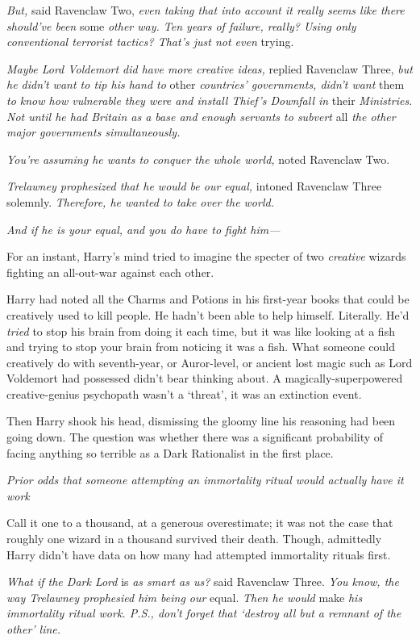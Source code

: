 \emph{But,} said Ravenclaw Two, \emph{even taking that into account{\el} it
really seems like there should've been} some \emph{other way. Ten years of
failure, really? Using only conventional terrorist tactics? That's just{\el}
not even} trying.

\emph{Maybe Lord Voldemort did have more creative ideas,} replied Ravenclaw
Three, \emph{but he didn't want to tip his hand to} other \emph{countries'
governments, didn't want} them \emph{to know how vulnerable they were and
install Thief's Downfall in} their \emph{Ministries. Not until he had Britain
as a base and enough servants to subvert} all \emph{the other major governments
simultaneously.}

\emph{You're assuming he wants to conquer the whole world,} noted Ravenclaw Two.

\emph{Trelawney prophesized that he would be our equal,} intoned Ravenclaw
Three solemnly. \emph{Therefore, he wanted to take over the world.}

\emph{And if he is your equal, and you do have to fight him—}

For an instant, Harry's mind tried to imagine the specter of two
\emph{creative} wizards fighting an all-out-war against each other.

Harry had noted all the Charms and Potions in his first-year books that could
be creatively used to kill people. He hadn't been able to help himself.
Literally. He'd \emph{tried} to stop his brain from doing it each time, but it
was like looking at a fish and trying to stop your brain from noticing it was a
fish. What someone could creatively do with seventh-year, or Auror-level, or
ancient lost magic such as Lord Voldemort had possessed{\el} didn't bear
thinking about. A magically-superpowered creative-genius psychopath wasn't a
`threat', it was an extinction event.

Then Harry shook his head, dismissing the gloomy line his reasoning had been
going down. The question was whether there was a significant probability of
facing anything so terrible as a Dark Rationalist in the first place.

\emph{Prior odds that someone attempting an immortality ritual would actually
have it work{\el}}

Call it one to a thousand, at a generous overestimate; it was not the case that
roughly one wizard in a thousand survived their death. Though, admittedly Harry
didn't have data on how many had attempted immortality rituals first.

\emph{What if the Dark Lord} is \emph{as smart as us?} said Ravenclaw Three.
\emph{You know, the way Trelawney prophesied him being our} equal. \emph{Then
he would} make \emph{his immortality ritual work. P.S., don't forget that
`destroy all but a remnant of the other' line.}

